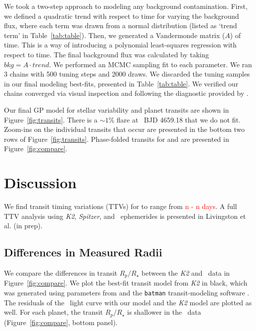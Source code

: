 \documentclass[twocolumn]{aastex631}
\begin{document}
We took a two-step approach to modeling any background contamination. First, we defined a quadratic trend with respect to time for varying the background flux, where each term was drawn from a normal distribution (listed as `trend term' in Table~\ref{tab:table}). Then, we generated a Vandermonde matrix ($A$) of time. This is a way of introducing a polynomial least-squares regression with respect to time. The final background flux was calculated by taking $bkg = A \cdot trend$.  
We performed an MCMC sampling fit to each parameter. We ran 3 chains with 500 tuning steps and 2000 draws. We discarded the tuning samples in our final modeling best-fits, presented in Table~\ref{tab:table}. We verified our chains converged via visual inspection and following the diagnostic provided by \cite{Geweke92}.

Our final GP model for stellar variability and planet transits are shown in Figure~\ref{fig:transits}. There is a $\sim 1\%$ flare at \tess\ BJD 4659.18 that we do not fit. Zoom-ins on the individual transits that occur are presented in the bottom two rows of Figure~\ref{fig:transits}. Phase-folded transits for \planetc and \planetd are presented in Figure~\ref{fig:compare}.

\section{Discussion} \label{sec:discussion}

We find transit timing variations (TTVs) for \planetknown to range from \textcolor{red}{n - n days}. A full TTV analysis using \textit{K2}, \textit{Spitzer}, and \tess\ ephemerides is presented in Livingston et al. (in prep). 


\subsection{Differences in Measured Radii}

We compare the differences in transit $R_p/R_\star$ between the \textit{K2} and \tess\ data in Figure~\ref{fig:compare}. We plot the best-fit transit model from \textit{K2} in black, which was generated using parameters from \cite{David2019a} and the \texttt{batman} transit-modeling software \citep{Kreidberg15}. The residuals of the \tess\ light curve with our model and the \textit{K2} model are plotted as well. For each planet, the transit $R_p/R_\star$ is shallower in the \tess\ data (Figure~\ref{fig:compare}, bottom panel).
\end{document}
